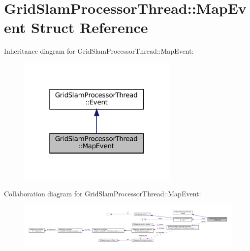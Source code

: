 \hypertarget{structGridSlamProcessorThread_1_1MapEvent}{}\section{Grid\+Slam\+Processor\+Thread\+:\+:Map\+Event Struct Reference}
\label{structGridSlamProcessorThread_1_1MapEvent}


Inheritance diagram for Grid\+Slam\+Processor\+Thread\+:\+:Map\+Event\+:
\nopagebreak
\begin{figure}[H]
\begin{center}
\leavevmode
\includegraphics[width=223pt]{structGridSlamProcessorThread_1_1MapEvent__inherit__graph}
\end{center}
\end{figure}


Collaboration diagram for Grid\+Slam\+Processor\+Thread\+:\+:Map\+Event\+:
\nopagebreak
\begin{figure}[H]
\begin{center}
\leavevmode
\includegraphics[width=350pt]{structGridSlamProcessorThread_1_1MapEvent__coll__graph}
\end{center}
\end{figure}
